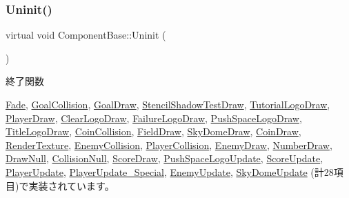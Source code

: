 \subsubsection{\texorpdfstring{Uninit()}{Uninit()}}
{\footnotesize\ttfamily virtual void Component\+Base\+::\+Uninit (\begin{DoxyParamCaption}{ }\end{DoxyParamCaption})\hspace{0.3cm}{\ttfamily [pure virtual]}}



終了関数 



\mbox{\hyperlink{class_fade_ae77d06811869d3c8162a42c3e0e14f7f}{Fade}}, \mbox{\hyperlink{class_goal_collision_ab818bad44ffcd595f1c495e659c0b348}{Goal\+Collision}}, \mbox{\hyperlink{class_goal_draw_a01318a0606848a3ca8ca7b7acbf4df24}{Goal\+Draw}}, \mbox{\hyperlink{class_stencil_shadow_test_draw_ad0672bf4ecfc8091cf54ed6f2c76b618}{Stencil\+Shadow\+Test\+Draw}}, \mbox{\hyperlink{class_tutorial_logo_draw_a949fb70954e3df28f87b8ed5c61bf8f1}{Tutorial\+Logo\+Draw}}, \mbox{\hyperlink{class_player_draw_a917b2947914287f23d87ca75cd68f553}{Player\+Draw}}, \mbox{\hyperlink{class_clear_logo_draw_aa73db5b701e644f8e552ddb254a0a9aa}{Clear\+Logo\+Draw}}, \mbox{\hyperlink{class_failure_logo_draw_a97646253380b54f37565650e211f33cd}{Failure\+Logo\+Draw}}, \mbox{\hyperlink{class_push_space_logo_draw_a79021c1df43968d6008de74126d53fba}{Push\+Space\+Logo\+Draw}}, \mbox{\hyperlink{class_title_logo_draw_a07bbf9e8de5c7b9ee028408496c13c50}{Title\+Logo\+Draw}}, \mbox{\hyperlink{class_coin_collision_aa852afdcdbedcf82809df9c7fd99be9e}{Coin\+Collision}}, \mbox{\hyperlink{class_field_draw_a89a78212c141714d9e39e25e663aaeff}{Field\+Draw}}, \mbox{\hyperlink{class_sky_dome_draw_aee1c6b102a97033073b2559b8c2c328b}{Sky\+Dome\+Draw}}, \mbox{\hyperlink{class_coin_draw_a6484c22a5598e298f18e7cd6083cd551}{Coin\+Draw}}, \mbox{\hyperlink{class_render_texture_a0e55cd9b412d87dfe1f4b90f29f357c8}{Render\+Texture}}, \mbox{\hyperlink{class_enemy_collision_a2a194c606fd162db803c70c6fed9b9e4}{Enemy\+Collision}}, \mbox{\hyperlink{class_player_collision_aa1ab60a62fa2ae3231a1ea0bc8faf801}{Player\+Collision}}, \mbox{\hyperlink{class_enemy_draw_a2861dc0623b0be7726bc69a6a469190e}{Enemy\+Draw}}, \mbox{\hyperlink{class_number_draw_a2b203d101f23f0d3f584937ff5ad662a}{Number\+Draw}}, \mbox{\hyperlink{class_draw_null_a12d44e341c7364b5ab9cdd661dc16187}{Draw\+Null}}, \mbox{\hyperlink{class_collision_null_a7c6d0ec502efc55e2f406415451152f5}{Collision\+Null}}, \mbox{\hyperlink{class_score_draw_aad744f8a7a1202e6ba8117c660f297ee}{Score\+Draw}}, \mbox{\hyperlink{class_push_space_logo_update_a94f791874cb6160cd33cd7068fcde0d0}{Push\+Space\+Logo\+Update}}, \mbox{\hyperlink{class_score_update_a701d9c84c3ef92b1c54f33b37e23605f}{Score\+Update}}, \mbox{\hyperlink{class_player_update_a997e0813a825d7525da4b5b89a290168}{Player\+Update}}, \mbox{\hyperlink{class_player_update___special_a60b5982ed56b52293a9e651ae7bf305f}{Player\+Update\+\_\+\+Special}}, \mbox{\hyperlink{class_enemy_update_a294a5d4c65551af43e933cb65036f279}{Enemy\+Update}}, \mbox{\hyperlink{class_sky_dome_update_a54da74ef017a22075ce473abe1345489}{Sky\+Dome\+Update}} (計28項目)で実装されています。

